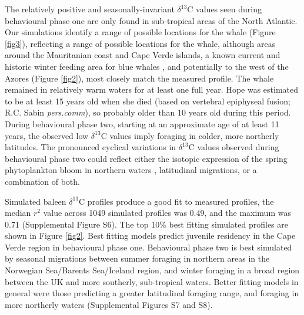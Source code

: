 \documentclass[a4paper,12pt]{article}
\begin{document}
 
The relatively positive and seasonally-invariant $\delta^{13}$C values seen during behavioural phase one are only found in sub-tropical areas of the North Atlantic.  
Our simulations identify a range of possible locations for the whale (Figure \ref{fig3}), reflecting a range of possible locations for the whale, although areas around the Mauritanian coast and Cape Verde islands, a known current and historic winter feeding area for blue whales \cite{baines2014upwellings,reeves2004historical}, and potentially to the west of the Azores (Figure \ref{fig2}), most closely match the measured profile. 
The whale remained in relatively warm waters for at least one full year. 
Hope was estimated to be at least 15 years old when she died (based on vertebral epiphyseal fusion; R.C. Sabin \textit{pers.comm}), so probably older than 10 years old during this period.
During behavioural phase two, starting at an approximate age of at least 11 years, the observed low $\delta^{13}$C values imply foraging in colder, more northerly latitudes. 
The pronounced cyclical variations in $\delta^{13}$C values observed during behavioural phase two could reflect either the isotopic expression of the spring phytoplankton bloom in northern waters \cite{magozzi2017using}, latitudinal migrations, or a combination of both.  

Simulated baleen $\delta^{13}$C profiles produce a good fit to measured profiles, the median $r^2$ value across 1049 simulated profiles was 0.49, and the maximum was 0.71 (Supplemental Figure S6).
The top 10\% best fitting simulated profiles are shown in Figure \ref{fig2}. 
Best fitting models predict juvenile residency in the Cape Verde region in behavioural phase one. 
Behavioural phase two is best simulated by seasonal migrations between summer foraging in northern areas in the Norwegian Sea/Barents Sea/Iceland region, and winter foraging in a broad region between the UK and more southerly, sub-tropical waters. 
Better fitting models in general were those predicting a greater latitudinal foraging range, and foraging in more northerly waters (Supplemental Figures S7 and S8).
\end{document}
